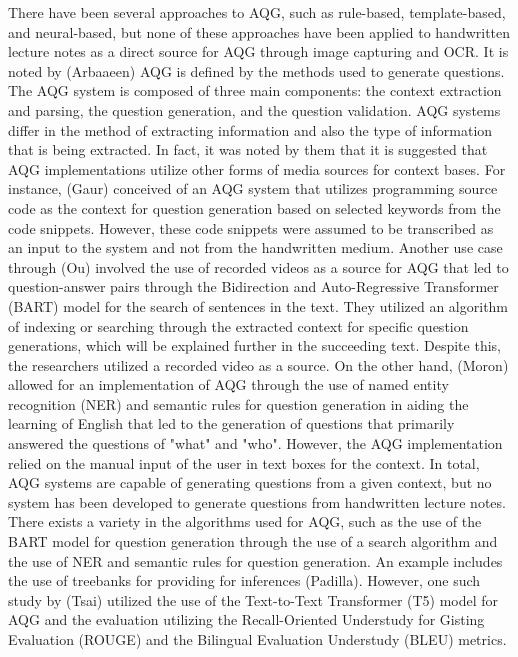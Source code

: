 \documentclass[conference]{IEEEtran}
\begin{document}
There have been several
approaches to AQG, such as rule-based, template-based, and neural-based,
but none of these approaches have been applied to handwritten lecture notes as 
a direct source for AQG through image capturing and OCR. It is noted by (Arbaaeen) AQG is defined by the methods used to generate questions.
The AQG system is composed of three main components: the context extraction and
parsing, the question generation, and the question validation. AQG systems differ in the method of extracting information and also 
the type of information that is being extracted. In fact, it was noted by them 
that it is suggested that AQG implementations utilize other forms of media 
sources for context bases. For instance, (Gaur) conceived 
of an AQG system that utilizes programming source code as the context for question
generation based on selected keywords from the code snippets. However, these 
code snippets were assumed to be transcribed as an input to the system and not 
from the handwritten medium. Another use case
through (Ou) involved the use of recorded videos as a source for AQG 
that led to question-answer pairs through the 
Bidirection and Auto-Regressive Transformer (BART) model for
the search of sentences in the text. They utilized an algorithm of indexing or 
searching through the extracted context for specific question generations, which 
will be explained further in the succeeding text. Despite this, the researchers utilized 
a recorded video as a source. On the other hand, (Moron) 
allowed for an implementation of AQG through the use of named entity recognition 
(NER) and semantic rules for question generation in aiding the learning of 
English that led to the generation of questions that primarily answered the
questions of "what" and "who". However, the AQG implementation relied on the 
manual input of the user in text boxes for the context. In total, AQG systems 
are capable of generating questions from a given context, but no system has been
developed to generate questions from handwritten lecture notes.
There exists a variety in the algorithms used for AQG, such as the use of 
the BART model for question generation through the use of a search algorithm and 
the use of NER and semantic rules for question generation. An example includes 
the use of treebanks for providing for inferences (Padilla). However, one such study
by (Tsai) utilized the use of the Text-to-Text Transformer (T5) model for AQG and
the evaluation utilizing the Recall-Oriented Understudy for Gisting Evaluation (ROUGE)
and the Bilingual Evaluation Understudy (BLEU) metrics. 
\end{document}

